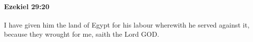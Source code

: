 
		\paragraph{Ezekiel 29:20} %
			\label{EZEKIEL-29-20}

			I have given him the land of Egypt for his labour wherewith he served against it, because they wrought for me, saith the Lord GOD.


